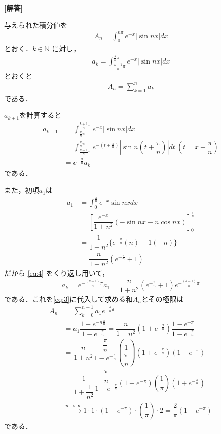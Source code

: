 \documentclass[../../main.tex]{subfiles}
\begin{document}
\begin{oframed}
  
\end{oframed}

{\bf [解答]}

与えられた積分値を
\begin{align}
  A_n = \int_0^{n\pi}e^{-x}|\sin nx|dx \label{eq:1}
\end{align}
とおく．$k \in \mathbb{N}$ に対し，
\begin{align}
  a_k = \int_{\frac{k-1}{n}\pi}^{\frac{k}{n}\pi} e^{-x} |\sin nx| dx \label{eq:2}
\end{align}
とおくと
\begin{align}
  A_n = \sum_{k=1}^n a_k \label{eq:3}
\end{align}
である．

$a_{k+1}$を計算すると
\begin{align}
  a_{k+1}
  &= \int_{\frac{k}{n}\pi}^{\frac{k+1}{n}\pi} e^{-x} |\sin nx| dx \\
  &= \int_{\frac{k-1}{n}\pi}^{\frac{k}{n}\pi} e^{-(t+\frac{\pi}{n})} |\sin n(t+\dfrac{\pi}{n})| dt\ (t = x - \dfrac{\pi}{n}) \\
  &= e^{-\frac{\pi}{n}} a_k \label{eq:4}
\end{align}
である．

また，初項$a_1$は
\begin{align}
  a_1
  &= \int_0^{\frac{\pi}{n}} e^{-x} \sin nx dx \\
  &= \left[ \dfrac{e^{-x}}{1+n^2} (-\sin nx - n \cos nx) \right]_0^{\frac{\pi}{n}} \\
  &= \dfrac{1}{1+n^2} \{ e^{-\frac{\pi}{n}} (n) - 1(-n) \} \\
  &= \dfrac{n}{1+n^2} (e^{-\frac{\pi}{n}} + 1) \label{eq:5}
\end{align}
だから \cref{eq:4} をくり返し用いて，
\begin{align}
  a_k = e^{-\frac{(k-1)}{n}\pi} a_1 = \dfrac{n}{1+n^2} (e^{-\frac{\pi}{n}} + 1) e^{-\frac{(k-1)}{n}\pi} \label{eq:6}
\end{align}
である．これを\cref{eq:3}に代入して求める和$A_n$とその極限は
\begin{align}
  A_n
  &= \sum_{k=0}^{n-1} a_1 e^{-\frac{k}{n}\pi} \\
  &= a_1 \dfrac{1-e^{-n \frac{\pi}{n}}}{1-e^{-\frac{\pi}{n}}} = \dfrac{n}{1+n^2} (1+e^{-\frac{\pi}{n}}) \dfrac{1-e^{-\pi}}{1-e^{-\frac{\pi}{n}}} \\
  &= \dfrac{n}{1+n^2} \dfrac{\dfrac{\pi}{n}}{1-e^{-\frac{\pi}{n}}} \left(\dfrac{1}{\dfrac{\pi}{n}}\right) (1+e^{-\frac{\pi}{n}})(1-e^{-\pi}) \\
  &= \dfrac{1}{1+\dfrac{1}{n^2}} \dfrac{\dfrac{\pi}{n}}{1-e^{-\frac{\pi}{n}}} (1-e^{-\pi}) \left(\dfrac{1}{\pi}\right) (1+e^{-\frac{\pi}{n}}) \\
  &\xrightarrow{n\to\infty} 1 \cdot 1 \cdot (1-e^{-\pi}) \cdot \left(\dfrac{1}{\pi}\right) \cdot 2 = \dfrac{2}{\pi}(1-e^{-\pi})
\end{align}
である．
\end{document}
